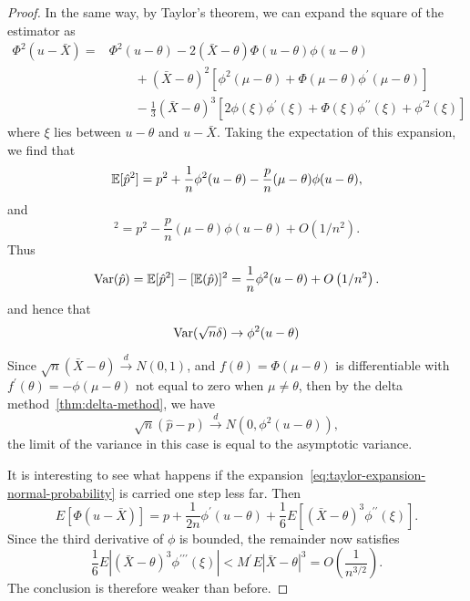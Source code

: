\begin{proof}
	In the same way, by Taylor's theorem, we can expand the square of the estimator as
	\begin{equation*}
		\begin{aligned}
			\Phi^{2}(u-\bar{X})= & \Phi^{2}(u-\theta)-2(\bar{X}-\theta)\Phi(u-\theta)\phi(u-\theta)                                                                      \\
			                     & \qquad+(\bar{X}-\theta)^{2}\left[\phi^{2}(\mu-\theta)+\Phi(\mu-\theta)\phi^{\prime}(\mu-\theta)\right]                                \\
			                     & \qquad-\frac{1}{3}(\bar{X}-\theta)^{3}\left[2\phi(\xi)\phi^{\prime}(\xi)+\Phi(\xi)\phi^{\prime\prime}(\xi)+\phi^{\prime2}(\xi)\right]
		\end{aligned}
	\end{equation*}
	where \(\xi\) lies between \(u-\theta\) and \(u-\bar{X}\). Taking the expectation of this expansion, we find that
	\begin{equation*}
		\mathbb{E}[\hat{p}^{2}]=p^{2}+\frac{1}{n}\phi^{2}(u-\theta)-\frac{p}{n}(\mu-\theta)\phi(u-\theta),
	\end{equation*}
	and
	\begin{equation*}
		[\bbE(\hat{p})]^{2}=p^{2}-\frac{p}{n}(\mu-\theta)\phi(u-\theta)+O\left(1/n^{2}\right).
	\end{equation*}
	Thus
	\begin{equation*}
		\mathrm{Var}(\hat{p})=\mathbb{E}[\hat{p}^{2}]-[\mathbb{E}(\hat{p})]^{2}=\frac{1}{n}\phi^{2}(u-\theta)+O\left(1/n^{2}\right).
	\end{equation*}
	and hence that
	\begin{equation*}
		\mathrm{Var}(\sqrt{n} \delta) \rightarrow \phi^2(u-\theta)
	\end{equation*}

	Since \(\sqrt{n}(\bar{X}-\theta) \stackrel{d}{\rightarrow} N\left(0,1\right)\), and \(f(\theta)=\Phi(\mu-\theta)\) is differentiable with \(f^{\prime}(\theta)=-\phi(\mu-\theta)\) not equal to zero when \(\mu\neq\theta\), then by the delta method~\eqref{thm:delta-method}, we have
	\begin{equation*}
		\sqrt{n}(\hat{p}-p)\stackrel{d}{\rightarrow}N\left(0,\phi^{2}(u-\theta)\right),
	\end{equation*}
	the limit of the variance in this case is equal to the asymptotic variance.

	It is interesting to see what happens if the expansion~\eqref{eq:taylor-expansion-normal-probability} is carried one step less far. Then
	\begin{equation*}
		E[\Phi(u-\bar{X})]=p+\frac{1}{2 n} \phi^{\prime}(u-\theta)+\frac{1}{6} E\left[(\bar{X}-\theta)^3 \phi^{\prime \prime}(\xi)\right].
	\end{equation*}
	Since the third derivative of \(\phi\) is bounded, the remainder now satisfies
	\begin{equation*}
		\frac{1}{6} E\left|(\bar{X}-\theta)^3 \phi^{\prime \prime \prime}(\xi)\right|<M^{\prime} E|\bar{X}-\theta|^3=O\left(\frac{1}{n^{3 / 2}}\right).
	\end{equation*}
	The conclusion is therefore weaker than before.
\end{proof}
